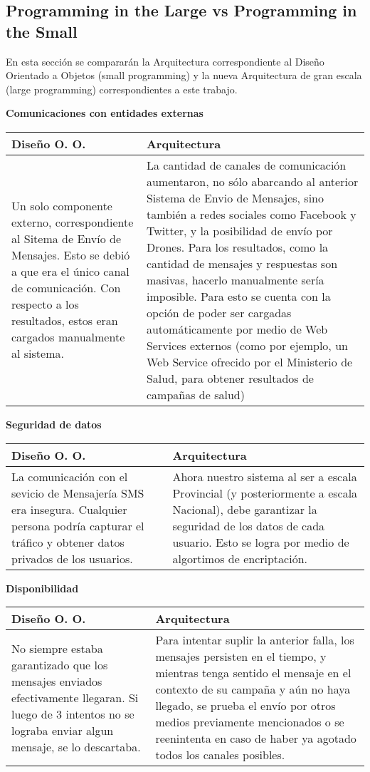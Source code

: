 \subsection{Programming in the Large vs Programming in the Small}

En esta secci\'on se comparar\'an la Arquitectura correspondiente al Dise\~no Orientado a Objetos (small programming) y la nueva Arquitectura de gran escala (large programming) correspondientes a este trabajo.


{\bf Comunicaciones con entidades externas} \\
\begin{tabular}{| p{8cm} | p{8cm} |}
\hline
Dise\~no O. O. & Arquitectura \\ \hline \hline
Un solo componente externo, correspondiente al Sitema de Env\'io de Mensajes. Esto se debi\'o a que era el \'unico canal de comunicaci\'on. Con respecto a los resultados, estos eran cargados manualmente al sistema. & La cantidad de canales de comunicaci\'on aumentaron, no s\'olo abarcando al anterior Sistema de Envio de Mensajes, sino tambi\'en a redes sociales como Facebook y Twitter, y la posibilidad de env\'io por Drones. Para los resultados, como la cantidad de mensajes y respuestas son masivas, hacerlo manualmente ser\'ia imposible. Para esto se cuenta con la opci\'on de poder ser cargadas autom\'aticamente por medio de Web Services externos (como por ejemplo, un Web Service ofrecido por el Ministerio de Salud, para obtener resultados de campa\~nas de salud) \\ \hline
\end{tabular}

{\bf Seguridad de datos} \\
\begin{tabular}{| p{8cm} | p{8cm} |}
\hline
Dise\~no O. O. & Arquitectura \\ \hline \hline

La comunicaci\'on con el sevicio de Mensajer\'ia SMS era insegura. Cualquier persona podr\'ia capturar el tr\'afico y obtener datos privados de los usuarios. & Ahora nuestro sistema al ser a escala Provincial (y posteriormente a escala Nacional), debe garantizar la seguridad de los datos de cada usuario. Esto se logra por medio de algortimos de encriptaci\'on. \\ \hline
\end{tabular}


{\bf Disponibilidad} \\
\begin{tabular}{| p{8cm} | p{8cm} |}
\hline
Dise\~no O. O. & Arquitectura \\ \hline \hline

No siempre estaba garantizado que los mensajes enviados efectivamente llegaran. Si luego de 3 intentos no se lograba enviar algun mensaje, se lo descartaba. & Para intentar suplir la anterior falla, los mensajes persisten en el tiempo, y mientras tenga sentido el mensaje en el contexto de su campa\~na y a\'un no haya llegado, se prueba el env\'io por otros medios previamente mencionados o se reenintenta en caso de haber ya agotado todos los canales posibles. \\ \hline
\end{tabular}

